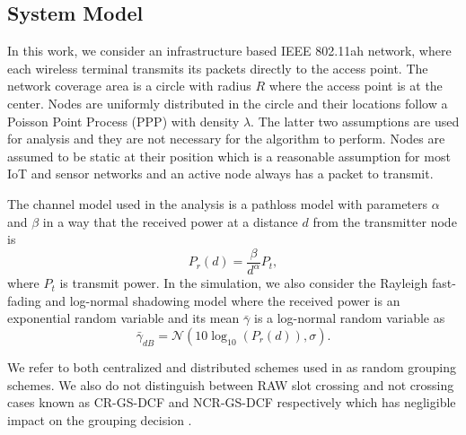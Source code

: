 \subsection{System Model} \label{systemmodel}

In this work, we consider an infrastructure based IEEE 802.11ah network, where each wireless terminal transmits its packets directly to the access point. %
The network coverage area is a circle with radius $R$ where the access point is at the center. Nodes are uniformly distributed in the circle and their locations follow a Poisson Point Process (PPP) with density $\lambda$. The latter two assumptions are used for analysis and they are not necessary for the algorithm to perform. Nodes are assumed to be static at their position which is a reasonable assumption for most IoT and sensor networks and an active node always has a packet to transmit. %

The channel model used in the analysis is a pathloss model with parameters $\alpha$ and $\beta$ in a way that the received power at a distance $d$ from the transmitter node is
\begin{equation}
P_r(d)=\frac{\beta}{d^\alpha} P_t,
\end{equation}
where $P_t$ is transmit power. In the simulation, we also consider the Rayleigh fast-fading and log-normal shadowing model where the received power is an exponential random variable and its mean $\bar{\gamma}$ is a log-normal random variable as 
\begin{equation}
\bar{\gamma}_{dB}= \mathcal{N}(10\log_{10}(P_r(d)),\sigma).
\end{equation}

We refer to both centralized and distributed schemes used in \cite{zheng2014performance} as random grouping schemes. We also do not distinguish between RAW slot crossing and not crossing cases known as CR-GS-DCF and NCR-GS-DCF respectively which has negligible impact on the grouping decision \cite{Draft80211ah}. 

